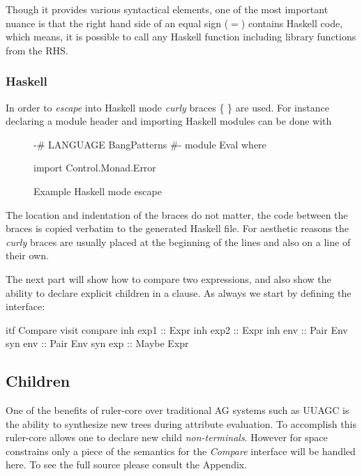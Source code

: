 Though it provides various syntactical elements, one of the most important nuance is that the right hand side of an equal sign ($=$) contains Haskell code, which means, it is possible to call any Haskell function including library functions from the RHS. 

\subsubsection{Haskell}
In order to \emph{escape} into Haskell mode \emph{curly} braces \{ \} are used. For instance declaring a module header and importing Haskell modules can be done with

\begin{figure}[!h]
\begin{code}
{
{-# LANGUAGE BangPatterns #-}
module Eval where

import Control.Monad.Error
}
\end{code}
\caption{Example Haskell mode escape}
\end{figure}

The location and indentation of the braces do not matter, the code between the braces is copied verbatim to the generated Haskell file. For aesthetic reasons the \emph{curly} braces are usually placed at the beginning of the lines and also on a line of their own. 

The next part will show how to compare two expressions, and also show the ability to declare explicit children in a clause. As always we start by defining the interface:

\begin{code}
itf Compare
  visit compare
    inh exp1 :: Expr
    inh exp2 :: Expr
    inh env  :: Pair Env
    syn env  :: Pair Env
    syn exp  :: Maybe Expr
\end{code}

\subsection{Children}
One of the benefits of ruler-core over traditional AG systems such as UUAGC is the ability to synthesize new trees during attribute evaluation. To accomplish this ruler-core allows one to declare new child \emph{non-terminals}. However for space constrains only a piece of the semantics for the \emph{Compare} interface will be handled here. To see the full source please consult the Appendix.

